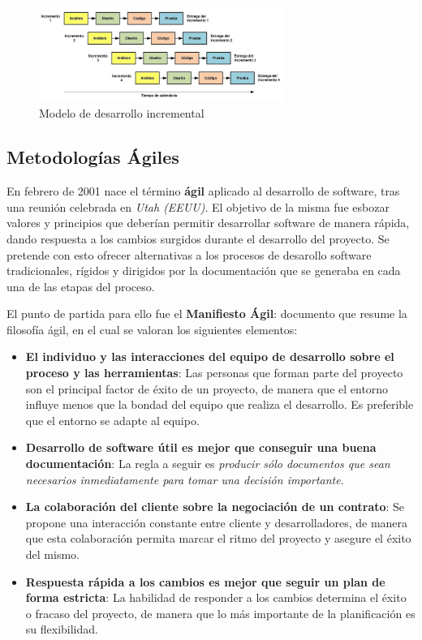 \begin{itemize}
    \begin{figure}[H]
        \centering
        \includegraphics[width=8cm]{Figures/modelo_incremental.png}
        \caption{Modelo de desarrollo incremental}
    \end{figure}
\end{itemize}

\subsection{Metodologías Ágiles}
En febrero de 2001 nace el término \textbf{ágil} aplicado al desarrollo de software, tras una reunión celebrada en 
\textit{Utah (EEUU)}. El objetivo de la misma fue esbozar valores y principios que deberían permitir desarrollar 
software de manera rápida, dando respuesta a los cambios surgidos durante el desarrollo del proyecto. Se pretende 
con esto ofrecer alternativas a los procesos de desarollo software tradicionales, rígidos y dirigidos por la documentación 
que se generaba en cada una de las etapas del proceso.\medskip

El punto de partida para ello fue el \textbf{Manifiesto Ágil}: %
documento que resume la filosofía ágil, en el cual se valoran los siguientes elementos:
\begin{itemize}
    \item \textbf{El individuo y las interacciones del equipo de desarrollo sobre el proceso y las herramientas}:
    Las personas que forman parte del proyecto son el principal factor de éxito de un proyecto, de manera que el entorno
    influye menos que la bondad del equipo que realiza el desarrollo. Es preferible que el entorno se adapte al equipo.

    \item \textbf{Desarrollo de software útil es mejor que conseguir una buena documentación}:
    La regla a seguir es \textit{producir sólo documentos que sean necesarios inmediatamente para tomar una 
    decisión importante}.

    \item \textbf{La colaboración del cliente sobre la negociación de un contrato}: Se propone una interacción 
    constante entre cliente y desarrolladores, de manera que esta colaboración permita marcar el ritmo del 
    proyecto y asegure el éxito del mismo.

    \item \textbf{Respuesta rápida a los cambios es mejor que seguir un plan de forma estricta}:
    La habilidad de responder a los cambios determina el éxito o fracaso del proyecto, de manera que lo
    más importante de la planificación es su flexibilidad.
\end{itemize} 

